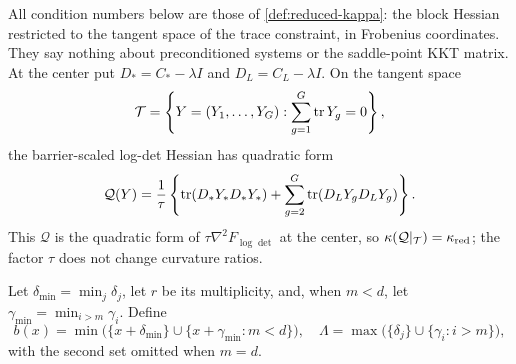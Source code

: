 All condition numbers below are those of \cref{def:reduced-kappa}: the
block Hessian restricted to the tangent space of the trace constraint, in
Frobenius coordinates.  They say nothing about preconditioned systems or the
saddle-point KKT matrix.  At the center put
$D_*=C_*-\lambda I$ and $D_L=C_L-\lambda I$.  On the tangent space
\begin{equation}
 \mathcal T=\left\{Y=(Y_1,\ldots,Y_G):
                    \sum_{g=1}^G\operatorname{tr} Y_g=0\right\},
 \label{eq:cond-tangent}
\end{equation}
the barrier-scaled log-det Hessian has quadratic form
\begin{equation}
\mathcal Q(Y)=\frac1\tau\left\{
  \operatorname{tr}(D_*Y_*D_*Y_*)+\sum_{g=2}^G\operatorname{tr}(D_LY_gD_LY_g)\right\}.
 \label{eq:cond-hessian-form}
\end{equation}
This \(\mathcal Q\) is the quadratic form of
\(\tau\nabla^2F_{\log\det}\) at the center, so
\(\kappa(\mathcal Q|_{\mathcal T})=\kappa_{\rm red}\); the factor \(\tau\)
does not change curvature ratios.

Let $\delta_{\min}=\min_j\delta_j$, let $r$ be its multiplicity, and, when
$m<d$, let $\gamma_{\min}=\min_{i>m}\gamma_i$.  Define
\begin{equation}
 b(x)=\min\bigl(\{x+\delta_{\min}\}\cup
                  \{x+\gamma_{\min}:m<d\}\bigr),
 \quad
 \Lambda=\max\bigl(\{\delta_j\}\cup
                  \{\gamma_i:i>m\}\bigr),
 \label{eq:cond-gap-extremes}
\end{equation}
with the second set omitted when $m=d$.

